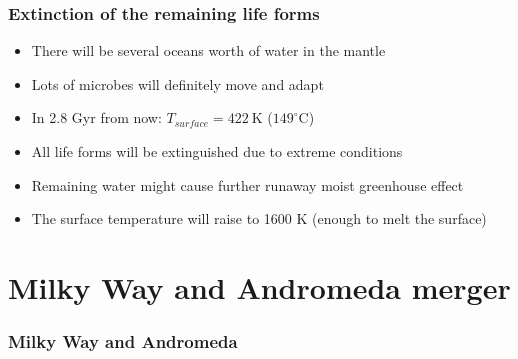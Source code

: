 \documentclass{beamer}
\begin{document}
\begin{frame}
\frametitle{Extinction of the remaining life forms}
\begin{itemize}
\item There will be several oceans worth of water in the mantle \cite{Bounama}
\item Lots of microbes will definitely move and adapt
\item In 2.8 Gyr from now: $T_{surface} = 422 \: \mathrm{K}$ ($149^\circ \mathrm{C}$)
\item All life forms will be extinguished due to extreme conditions
\item Remaining water might cause further runaway moist greenhouse effect
\item The surface temperature will raise to 1600 K (enough to melt the surface)
\end{itemize}
\end{frame}

\section{Milky Way and Andromeda merger}
\begin{frame}
\frametitle{Milky Way and Andromeda}
\end{frame}
\end{document}

